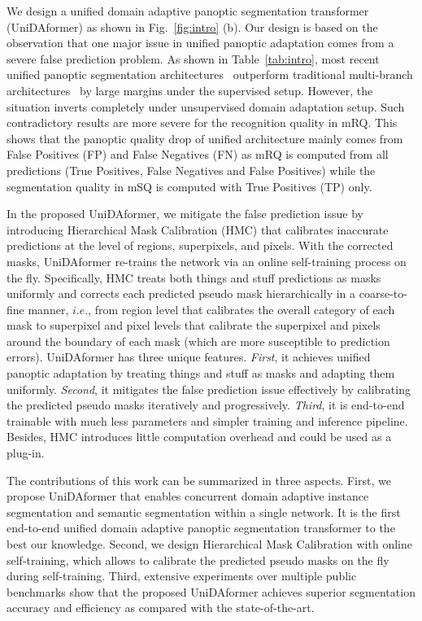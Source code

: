 \documentclass[10pt,twocolumn,letterpaper]{article}
\begin{document}
We design a unified domain adaptive panoptic segmentation transformer (UniDAformer) as shown in Fig.~\ref{fig:intro} (b). Our design is based on the observation that one major issue in unified panoptic adaptation comes from a severe false prediction problem. As shown in Table~\ref{tab:intro}, most recent unified panoptic segmentation architectures~\cite{carion2020detr,li2021fullypanoptic,cheng2021maskformer} outperform traditional multi-branch architectures~\cite{kirillov2019panoptic} by large margins under the supervised setup. However, the situation inverts completely under unsupervised domain adaptation setup.
Such contradictory results are more severe for the recognition quality in mRQ. 
This shows that the panoptic quality drop of unified architecture mainly comes from False Positives (FP) and False Negatives (FN) as mRQ is computed from all predictions (True Positives, False Negatives and False Positives) while the segmentation quality in mSQ is computed with True Positives (TP) only.




In the proposed UniDAformer, we mitigate the false prediction issue by introducing Hierarchical Mask Calibration (HMC) that calibrates inaccurate predictions at the level of regions, superpixels, and pixels. With the corrected masks, UniDAformer re-trains the network via an online self-training process on the fly. Specifically, HMC treats both things and stuff predictions as masks uniformly and corrects each predicted pseudo mask hierarchically in a coarse-to-fine manner, $i.e.$, from region level that calibrates the overall category of each mask to superpixel and pixel levels that calibrate the superpixel and pixels around the boundary of each mask (which are more susceptible to prediction errors).
UniDAformer has three unique features. \textit{First}, it achieves unified panoptic adaptation by treating things and stuff as masks and adapting them uniformly. \textit{Second}, it mitigates the false prediction issue effectively by calibrating the predicted pseudo masks iteratively and progressively. 
\textit{Third}, it is end-to-end trainable with much less parameters and simpler training and inference pipeline.
Besides, HMC introduces little computation overhead and could be used as a plug-in.

The contributions of this work can be summarized in three aspects. First, we propose UniDAformer that enables concurrent domain adaptive instance segmentation and semantic segmentation within a single network. It is the first end-to-end unified domain adaptive panoptic segmentation transformer to the best our knowledge.
Second, we design Hierarchical Mask Calibration with online self-training, which allows to calibrate the predicted pseudo masks on the fly during self-training. 
Third, extensive experiments over multiple public benchmarks show that the proposed UniDAformer achieves superior segmentation accuracy and efficiency as compared with the state-of-the-art.
\end{document}
